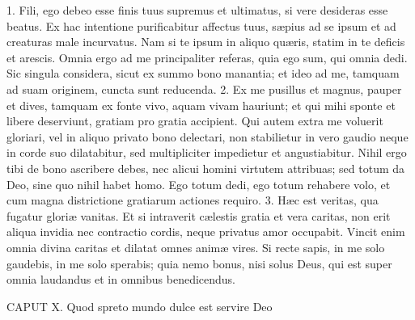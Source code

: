 1. Fili, ego debeo esse finis tuus supremus et ultimatus, si vere desideras esse beatus. Ex hac intentione purificabitur affectus tuus, sæpius ad se ipsum et ad creaturas male incurvatus. Nam si te ipsum in aliquo quæris, statim in te deficis et arescis. Omnia ergo ad me principaliter referas, quia ego sum, qui omnia dedi. Sic singula considera, sicut ex summo bono manantia; et ideo ad me, tamquam ad suam originem, cuncta sunt reducenda.
2. Ex me pusillus et magnus, pauper et dives, tamquam ex fonte vivo, aquam vivam hauriunt; et qui mihi sponte et libere deserviunt, gratiam pro gratia accipient. Qui autem extra me voluerit gloriari, vel in aliquo privato bono delectari, non stabilietur in vero gaudio neque in corde suo dilatabitur, sed multipliciter impedietur et angustiabitur. Nihil ergo tibi de bono ascribere debes, nec alicui homini virtutem attribuas; sed totum da Deo, sine quo nihil habet homo. Ego totum dedi, ego totum rehabere volo, et cum magna districtione gratiarum actiones requiro.
3. Hæc est veritas, qua fugatur gloriæ vanitas. Et si intraverit cælestis gratia et vera caritas, non erit aliqua invidia nec contractio cordis, neque privatus amor occupabit. Vincit enim omnia divina caritas et dilatat omnes animæ vires. Si recte sapis, in me solo gaudebis, in me solo sperabis; quia nemo bonus, nisi solus Deus, qui est super omnia laudandus et in omnibus benedicendus.


CAPUT X.
Quod spreto mundo dulce est servire Deo

